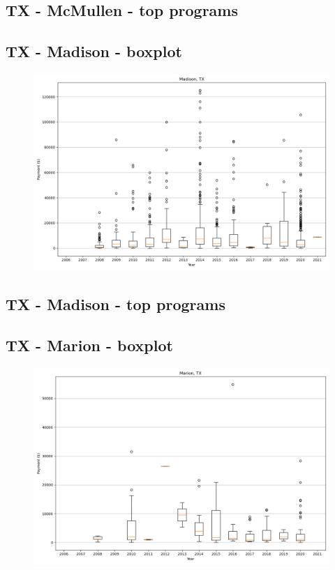 \subsection*{TX - McMullen - top programs}

\newpage
\subsection*{TX - Madison - boxplot}
\begin{figure}[h]
\centering
\includegraphics[width=7in]{../output/boxplots/counties/Madison-TX_boxplot.png}
\end{figure}


\subsection*{TX - Madison - top programs}

\newpage
\subsection*{TX - Marion - boxplot}
\begin{figure}[h]
\centering
\includegraphics[width=7in]{../output/boxplots/counties/Marion-TX_boxplot.png}
\end{figure}


